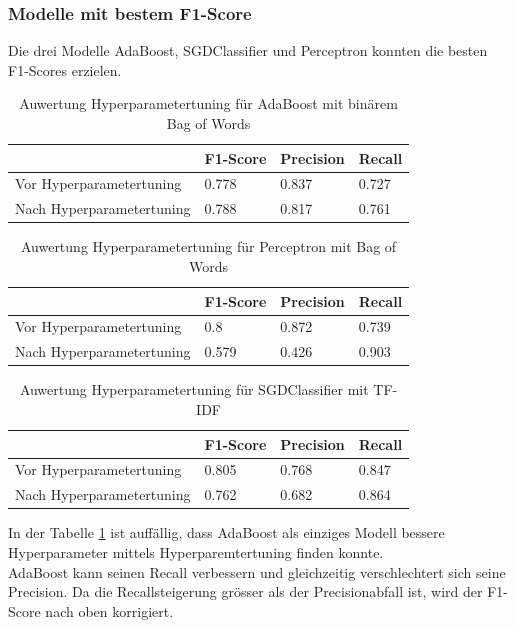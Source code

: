 \subsubsection{Modelle mit bestem F1-Score}
Die drei Modelle AdaBoost, SGDClassifier und Perceptron konnten die besten F1-Scores erzielen.\\
\begin{table}[H]
	\caption{Auwertung Hyperparametertuning für AdaBoost mit binärem Bag of Words}
	\centering
	\label{tab:ada}
	\begin{tabular}{|l|l|l|l|}
		\hline
		& F1-Score & Precision & Recall\\
		\hline
		Vor Hyperparametertuning & 0.778 & 0.837 & 0.727 \\
		Nach Hyperparametertuning & 0.788 & 0.817 & 0.761 \\
		\hline
	\end{tabular}
\end{table}
\begin{table}[H]
	\caption{Auwertung Hyperparametertuning für Perceptron mit Bag of Words}
	\centering
	\label{tab:per}
	\begin{tabular}{|l|l|l|l|}
		\hline
		& F1-Score & Precision & Recall\\
		\hline
		Vor Hyperparametertuning & 0.8 & 0.872 & 0.739 \\
		Nach Hyperparametertuning & 0.579 & 0.426 & 0.903 \\
		\hline
	\end{tabular}
\end{table}
\begin{table}[H]
	\caption{Auwertung Hyperparametertuning für SGDClassifier mit TF-IDF}
	\centering
	\label{tab:sgd}
	\begin{tabular}{|l|l|l|l|}
		\hline
		& F1-Score & Precision & Recall\\
		\hline
		Vor Hyperparametertuning & 0.805 & 0.768 & 0.847 \\
		Nach Hyperparametertuning & 0.762 & 0.682 & 0.864 \\
		\hline
	\end{tabular}
\end{table}
In der Tabelle \cref{tab:ada} ist auffällig, dass AdaBoost als einziges Modell bessere Hyperparameter mittels Hyperparemtertuning finden konnte.\\
AdaBoost kann seinen Recall verbessern und gleichzeitig verschlechtert sich seine Precision.
Da die Recallsteigerung grösser als der Precisionabfall ist, wird der F1-Score nach oben korrigiert.\\
